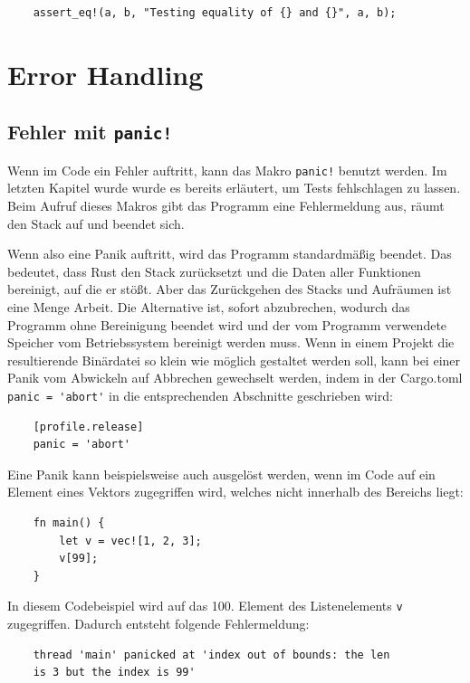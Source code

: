 \begin{lstlisting}
    assert_eq!(a, b, "Testing equality of {} and {}", a, b);
\end{lstlisting}


\section{Error Handling}

\subsection{Fehler mit \texttt{panic!}}

Wenn im Code ein Fehler auftritt, kann das Makro \verb"panic!" benutzt werden. Im letzten Kapitel wurde wurde es bereits erläutert, um Tests fehlschlagen zu lassen. Beim Aufruf dieses Makros gibt das Programm eine Fehlermeldung aus, räumt den Stack auf und beendet sich.

Wenn also eine Panik auftritt, wird das Programm standardmäßig beendet. Das bedeutet, dass Rust den Stack zurücksetzt und die Daten aller Funktionen bereinigt, auf die er stößt. Aber das Zurückgehen des Stacks und Aufräumen ist eine Menge Arbeit. Die Alternative ist, sofort abzubrechen, wodurch das Programm ohne Be\-rei\-ni\-gung beendet wird und der vom Programm verwendete Speicher vom Be\-triebs\-sys\-tem bereinigt werden muss. Wenn in einem Projekt die resultierende Binärdatei so klein wie möglich gestaltet werden soll, kann bei einer Panik vom \glqq Abwickeln\grqq{} auf \glqq Abbrechen\grqq{} gewechselt werden, indem in der Cargo.toml \verb"panic = 'abort'" in die entsprechenden Abschnitte geschrieben wird:

\begin{lstlisting}
    [profile.release]
    panic = 'abort'
\end{lstlisting}

Eine Panik kann beispielsweise auch ausgelöst werden, wenn im Code auf ein Element eines Vektors zugegriffen wird, welches nicht innerhalb des Bereichs liegt:

\begin{lstlisting}
    fn main() {
        let v = vec![1, 2, 3];
        v[99];
    }
\end{lstlisting}

In diesem Codebeispiel wird auf das 100. Element des Listenelements \verb"v" zugegriffen. Dadurch entsteht folgende Fehlermeldung:

\begin{lstlisting}
    thread 'main' panicked at 'index out of bounds: the len
    is 3 but the index is 99'
\end{lstlisting}

